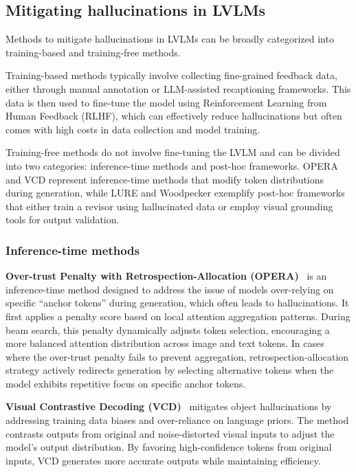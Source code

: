 \subsection{Mitigating hallucinations in LVLMs}\label{subsec-mitigating}
Methods to mitigate hallucinations in LVLMs can be broadly categorized into training-based and training-free methods. 

Training-based methods typically involve collecting fine-grained feedback data, either through manual annotation or LLM-assisted recaptioning frameworks. This data is then used to fine-tune the model using Reinforcement Learning from Human Feedback (RLHF), which can effectively reduce hallucinations but often comes with high costs in data collection and model training. 

Training-free methods do not involve fine-tuning the LVLM and can be divided into two categories: inference-time methods and post-hoc frameworks. OPERA and VCD represent inference-time methods that modify token distributions during generation, while LURE and Woodpecker exemplify post-hoc frameworks that either train a revisor using hallucinated data or employ visual grounding tools for output validation.

\subsubsection{Inference-time methods}\label{subsubsec-inference}
\textbf{Over-trust Penalty with Retrospection-Allocation (OPERA)}~\cite{huang2024opera} is an inference-time method designed to address the issue of models over-relying on specific \textquotedblleft anchor tokens\textquotedblright{} during generation, which often leads to hallucinations. It first applies a penalty score based on local attention aggregation patterns. During beam search, this penalty dynamically adjusts token selection, encouraging a more balanced attention distribution across image and text tokens. In cases where the over-trust penalty fails to prevent aggregation, retrospection-allocation strategy actively redirects generation by selecting alternative tokens when the model exhibits repetitive focus on specific anchor tokens.


\textbf{Visual Contrastive Decoding (VCD)}~\cite{leng2024mitigating} mitigates object hallucinations by addressing training data biases and over-reliance on language priors. The method contrasts outputs from original and noise-distorted visual inputs to adjust the model's output distribution. By favoring high-confidence tokens from original inputs, VCD generates more accurate outputs while maintaining efficiency.

